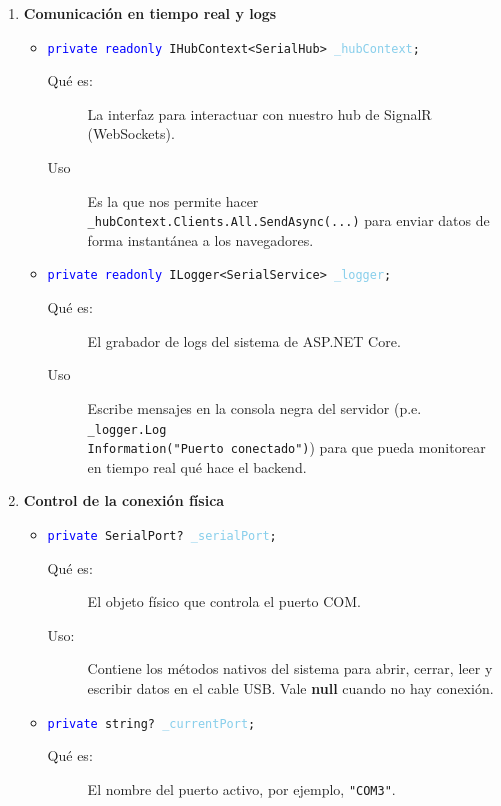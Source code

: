 \documentclass[
10pt, %
a4paper, %
oneside, %
headinclude,footinclude, %
BCOR5mm, %
]{scrartcl}
\begin{document}
\begin{enumerate}
	\item \textbf{Comunicación en tiempo real y logs}
	\begin{itemize}
		\item \texttt{\textcolor{blue}{private readonly} \textcolor{Emerald}{IHubContext<SerialHub>} \textcolor{SkyBlue}{\_hubContext};}
		\begin{description}
			\item[Qué es:] La interfaz para interactuar con nuestro hub de SignalR (WebSockets).
			\item[Uso] Es la que nos permite hacer \texttt{\_hubContext.Clients.All.SendAsync(...)} para enviar datos de forma instantánea a los navegadores.
		\end{description}
		
		\item \texttt{\textcolor{blue}{private readonly} \textcolor{Emerald}{ILogger<SerialService>} \textcolor{SkyBlue}{\_logger};}
		\begin{description}
			\item[Qué es:] El grabador de logs del sistema de ASP.NET Core.
			\item[Uso] Escribe mensajes en la consola negra del servidor (p.e. \texttt{\_logger.Log\\Information("Puerto conectado")}) para que pueda monitorear en tiempo real qué hace el backend.
		\end{description}
	\end{itemize}
	\item \textbf{Control de la conexión física}
	\begin{itemize}
		\item \texttt{\textcolor{blue}{private} \textcolor{Emerald}{SerialPort}? \textcolor{SkyBlue}{\_serialPort};}
		\begin{description}
			\item[Qué es:] El objeto físico que controla el puerto COM.
			\item[Uso:] Contiene los métodos nativos del sistema para abrir, cerrar, leer y escribir datos en el cable USB. Vale \textbf{null} cuando no hay conexión.
		\end{description}
		
		\item \texttt{\textcolor{blue}{private} \textcolor{Emerald}{string}? \textcolor{SkyBlue}{\_currentPort};}
		\begin{description}
			\item[Qué es:] El nombre del puerto activo, por ejemplo, \texttt{"COM3"}.
		\end{description}
		

\end{itemize}
\end{enumerate}
\end{document}
